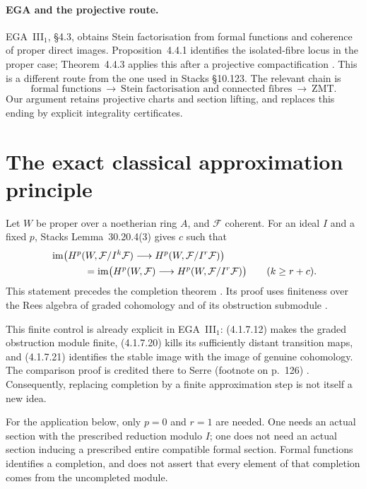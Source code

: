 \documentclass[11pt]{amsart}
\begin{document}
\paragraph{EGA and the projective route.}
EGA~III$_1$, \S4.3, obtains Stein factorisation from formal functions and
coherence of proper direct images. Proposition~4.4.1 identifies the
isolated-fibre locus in the proper case; Theorem~4.4.3 applies this after
a projective compactification \cite{EGA}. This is a different route from the one
used in Stacks \S10.123. The relevant chain is
\[
 \text{formal functions}\ \longrightarrow\
 \text{Stein factorisation and connected fibres}\ \longrightarrow\
 \text{ZMT}.
\]
Our argument retains projective charts and section lifting, and replaces
this ending by explicit integrality certificates.

\section{The exact classical approximation principle}

Let $W$ be proper over a noetherian ring $A$, and $\mathcal F$ coherent.
For an ideal $I$ and a fixed $p$, Stacks Lemma~30.20.4(3) gives $c$ such that
\begin{align*}
 &\operatorname{im}\bigl(H^p(W,\mathcal F/I^k\mathcal F)
       \longrightarrow H^p(W,\mathcal F/I^r\mathcal F)\bigr)\\
 &\hspace{12mm}=\operatorname{im}\bigl(H^p(W,\mathcal F)
       \longrightarrow H^p(W,\mathcal F/I^r\mathcal F)\bigr)
       \qquad(k\ge r+c).
\end{align*}
This statement precedes the completion theorem \cite{StacksApprox}.
Its proof uses finiteness over the Rees algebra of graded cohomology and
of its obstruction submodule \cite{StacksFormal}.

This finite control is already explicit in EGA~III$_1$:
(4.1.7.12) makes the graded obstruction module finite,
(4.1.7.20) kills its sufficiently distant transition maps, and
(4.1.7.21) identifies the stable image with the image of genuine
cohomology. The comparison proof is credited there to Serre
(footnote on p.~126) \cite{EGA}. Consequently, replacing completion by a finite
approximation step is not itself a new idea.

For the application below, only $p=0$ and $r=1$ are needed.
One needs an actual section with the prescribed reduction modulo $I$;
one does not need an actual section inducing a prescribed entire
compatible formal section. Formal functions identifies a completion,
and does not assert that every element of that completion comes from
the uncompleted module.
\end{document}

